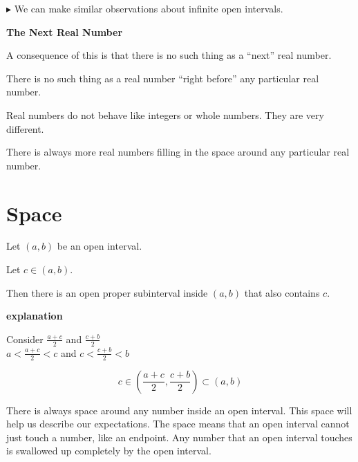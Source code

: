 \documentclass{ximera}
\begin{document}
$\blacktriangleright$ We can make similar observations about infinite open intervals. 






\begin{idea} \textbf{\textcolor{blue!55!black}{The Next Real Number}}


A consequence of this is that there is no such thing as a ``next'' real number. 


There is no such thing as a real number ``right before'' any particular real number.


\end{idea}

Real numbers do not behave like integers or whole numbers.  They are very different. 

There is always more real numbers filling in the space around any particular real number. 









\section*{Space}

\begin{observation} 


Let $(a,b)$ be an open interval.

Let $c \in (a,b)$.

Then there is an open proper subinterval inside $(a,b)$ that also contains $c$.

\textbf{\textcolor{red!75!green}{explanation}} 


Consider $\frac{a+c}{2}$ and  $\frac{c+b}{2}$ \\

$a < \frac{a+c}{2} < c$ and  $c < \frac{c+b}{2}  < b$



\[   c \in \left(\frac{a+c}{2} , \frac{c+b}{2} \right) \subset (a,b)              \]


\end{observation}


There is always space around any number inside an open interval.  This space will help us describe our expectations.  The space means that an open interval cannot just touch a number, like an endpoint.  Any number that an open interval touches is swallowed up completely by the open interval.
\end{document}
